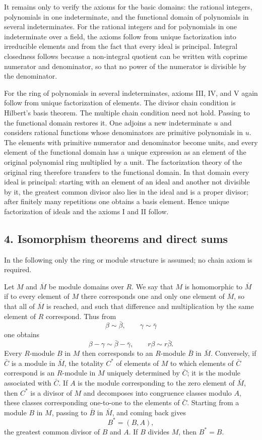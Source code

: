 \documentclass[11pt]{article}
\begin{document}
It remains only to verify the axioms for the basic domains: the rational integers, polynomials in one indeterminate, and the functional domain of polynomials in several indeterminates. For the rational integers and for polynomials in one indeterminate over a field, the axioms follow from unique factorization into irreducible elements and from the fact that every ideal is principal. Integral closedness follows because a non-integral quotient can be written with coprime numerator and denominator, so that no power of the numerator is divisible by the denominator.

For the ring of polynomials in several indeterminates, axioms III, IV, and V again follow from unique factorization of elements. The divisor chain condition is Hilbert's basis theorem. The multiple chain condition need not hold. Passing to the functional domain restores it. One adjoins a new indeterminate $u$ and considers rational functions whose denominators are primitive polynomials in $u$. The elements with primitive numerator and denominator become units, and every element of the functional domain has a unique expression as an element of the original polynomial ring multiplied by a unit. The factorization theory of the original ring therefore transfers to the functional domain. In that domain every ideal is principal: starting with an element of an ideal and another not divisible by it, the greatest common divisor also lies in the ideal and is a proper divisor; after finitely many repetitions one obtains a basis element. Hence unique factorization of ideals and the axioms I and II follow.


\subsection{4. Isomorphism theorems and direct sums}

In the following only the ring or module structure is assumed; no chain axiom is required.

Let $M$ and $\overline M$ be module domains over $R$. We say that $M$ is homomorphic to $\overline M$ if to every element of $M$ there corresponds one and only one element of $\overline M$, so that all of $\overline M$ is reached, and such that difference and multiplication by the same element of $R$ correspond. Thus from
\[
  \beta\sim \bar\beta,
  \qquad \gamma\sim\bar\gamma
\]
one obtains
\[
  \beta-\gamma\sim \bar\beta-\bar\gamma,
  \qquad r\beta\sim r\bar\beta.
\]
Every $R$-module $B$ in $M$ then corresponds to an $R$-module $\bar B$ in $\bar M$. Conversely, if $\bar C$ is a module in $\bar M$, the totality $C^*$ of elements of $M$ to which elements of $\bar C$ correspond is an $R$-module in $M$ uniquely determined by $\bar C$; it is the module associated with $\bar C$. If $A$ is the module corresponding to the zero element of $\bar M$, then $C^*$ is a divisor of $M$ and decomposes into congruence classes modulo $A$, these classes corresponding one-to-one to the elements of $\bar C$. Starting from a module $B$ in $M$, passing to $\bar B$ in $\bar M$, and coming back gives
\[
  B^*=(B,A),
\]
the greatest common divisor of $B$ and $A$. If $B$ divides $M$, then $B^*=B$.
\end{document}
